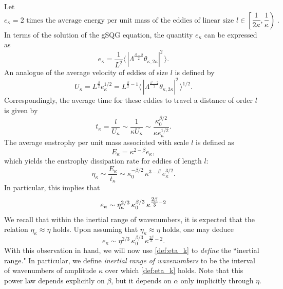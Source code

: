 \documentclass[twoside, reqno]{amsart}
\numberwithin{lemma}{section}
\numberwithin{theorem}{section}
\numberwithin{proposition}{section}
\numberwithin{equation}{section} %
\newcommand{\ka}{\kappa}
\newcommand{\be}{\beta}
\begin{document}
Let
\begin{equation*}
    e_{\kappa} = \text{2 times the average energy per unit mass of the eddies of linear size } \mathit{l} \in \left[\frac{1}{2\ka}, \frac{1}{\ka} \right) \;.
\end{equation*}
In terms of the solution of the gSQG equation, the quantity $e_{\kappa}$ can be expressed as  
\begin{equation} \label{def:e_k}
    e_{\kappa} = {\frac{1}{L^2}}\big\langle \,|\Lambda^{\tfrac{\beta - 2}{2}} \theta_{\kappa,2\kappa}|^2 \,\big\rangle .
\end{equation}
An analogue of the average velocity of eddies of size $l$ is defined by  
\begin{equation*}
    U_\kappa = {L^{\frac{\be}2}}
    e_\kappa^{1/2}
      = {L^{\frac{\be}2-1}}
        \big\langle \,|\Lambda^{\tfrac{\beta - 2}{2}} \theta_{\kappa,2\kappa}|^2 \,\big\rangle^{1/2}.
\end{equation*}
Correspondingly, the average time for these eddies to travel a distance of order $l$ is given by  %
\begin{equation*}
    t_\kappa = \frac{l}{U_\kappa} \sim \frac{1}{\kappa U_\kappa}
      \sim
      \frac{\kappa_0^{\beta/2}}{\kappa e_\kappa^{1/2}}.
\end{equation*}
The average enstrophy per unit mass associated with scale $l$ is defined as
\[
E_\kappa = \kappa^{2-\beta} e_\kappa,
\]
which yields the enstrophy dissipation rate for eddies of length $l$:  
\begin{equation*}
    \eta_\kappa \sim \frac{E_\kappa}{t_\kappa}
      \sim \kappa_0^{-\beta/2}\,\kappa^{3-\beta}\, e_\kappa^{3/2}.
\end{equation*}
{In particular, this implies that}
    \begin{align}\notag
        e_\kappa \sim \eta_\kappa^{2/3}\,\kappa_0^{\beta/3}\,\kappa^{\tfrac{2\beta}{3}-2}
    \end{align}
{We recall that within the inertial range of wavenumbers, it is expected that the relation $\eta_\kappa \approx \eta$ holds. Upon assuming that $\eta_\kappa\approx\eta$ holds, one may deduce}
\begin{equation} \label{def:eta_k}
    e_\kappa \sim \eta^{2/3}\, \kappa_0^{\beta/3}\,\kappa^{\tfrac{2\beta}{3}-2}.
\end{equation}
{With this observation in hand, we will now use \eqref{def:eta_k} to \textit{define} the ``inertial range." In particular, we define {\it inertial range of wavenumbers} to be the interval of wavenumbers of amplitude $\kappa$ over which \eqref{def:eta_k} holds.  Note that this power law depends explicitly on $\beta$, but it depends on $\alpha$ only implicitly through $\eta$.}
\end{document}
